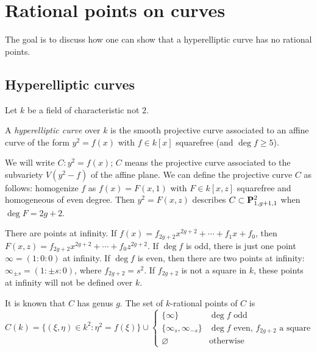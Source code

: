 
\section{Rational points on curves}





The goal is to discuss how one can show that a hyperelliptic curve has no 
rational points. 





\subsection{Hyperelliptic curves}

Let $k$ be a field of characteristic not $2$. 

\begin{defi}
A \emph{hyperelliptic curve} over $k$ is the smooth projective curve associated 
to an affine curve of the form $y^2=f(x)$ with $f\in k[x]$ squarefree (and 
$\deg f\geqslant 5$). 
\end{defi}

We will write $C:y^2=f(x)$; $C$ means the projective curve associated to 
the subvariety $V(y^2-f)$ of the affine plane. We can define the projective 
curve $C$ as follows: homogenize $f$ as $f(x)=F(x,1)$ with 
$F\in k[x,z]$ squarefree and homogeneous of even degree. Then 
$y^2=F(x,z)$ describes $C\subset \mathbf{P}_{1,g+1,1}^2$ when $\deg F=2 g+2$. 

There are points at infinity. If 
$f(x)=f_{2 g+2} x^{2 g+2} + \cdots + f_1 x + f_0$, then 
$F(x,z) = f_{2 g+2} x^{2 g+2} + \cdots + f_0 z^{2 g+2}$. If $\deg f$ is odd, 
there is just one point $\infty=(1:0:0)$ at infinity. If $\deg f$ is even, 
then there are two points at infinity: $\infty_{\pm s} = (1:\pm s:0)$, where 
$f_{2 g+2}=s^2$. If $f_{2 g+2}$ is not a square in $k$, these points at 
infinity will not be defined over $k$. 

It is known that $C$ has genus $g$. The set of $k$-rational points of $C$ is 
\[
  C(k) = \{(\xi,\eta)\in k^2 : \eta^2 = f(\xi)\} \cup 
  \begin{cases} 
    \{\infty\} & \deg f\text{ odd} \\ 
    \{\infty_s,\infty_{-s}\} & \deg f\text{ even, $f_{2 g+2}$ a square} \\ 
    \varnothing & \text{otherwise} 
  \end{cases}
\]


